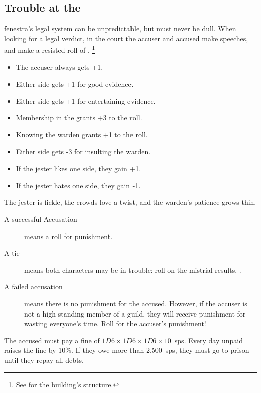 \begin{multicols}{2}
\subsection{Trouble at the }
\label{courtVerdicts}

\Gls{fenestra}'s legal system can be unpredictable, but must never be dull.
When looking for a legal verdict, in the \gls{court} the accuser and accused make speeches, and make a resisted roll of .%
\footnote{See  for the building's structure.}

\begin{itemize}
  \item
  The accuser always gets +1.
  \item
  Either side gets +1 for good evidence.
  \item
  Either side gets +1 for entertaining evidence.
  \item
  Membership in the  grants +3 to the roll.
  \item
  Knowing the \gls{warden} grants +1 to the roll.
  \item
  Either side gets -3 for insulting the \gls{warden}.
  \item
  If the jester likes one side, they gain +1.
  \item
  If the jester hates one side, they gain -1.
\end{itemize}

The jester is fickle, the crowds love a twist, and the \gls{warden}'s patience grows thin.

\begin{description}
  \item[A successful Accusation]
  means a roll for punishment.
  \item[A tie]
  means both characters may be in trouble: roll on the mistrial results, .
  \item[A failed accusation]
  means there is no punishment for the accused.
  However, if the accuser is not a high-standing member of a guild, they will receive punishment for wasting everyone's time.
  Roll for the accuser's punishment!
\end{description}

\begin{dlist}
  \item
  \ifodd\value{temperature}
    The accused must pay a fine of $1D6\times 1D6\times 1D6\times 10$~\glspl{sp}.
    Every day unpaid raises the fine by 10\%.
    If they owe more than 2,500~\glspl{sp}, they must go to prison until they repay all debts.


\end{dlist}
\end{multicols}

